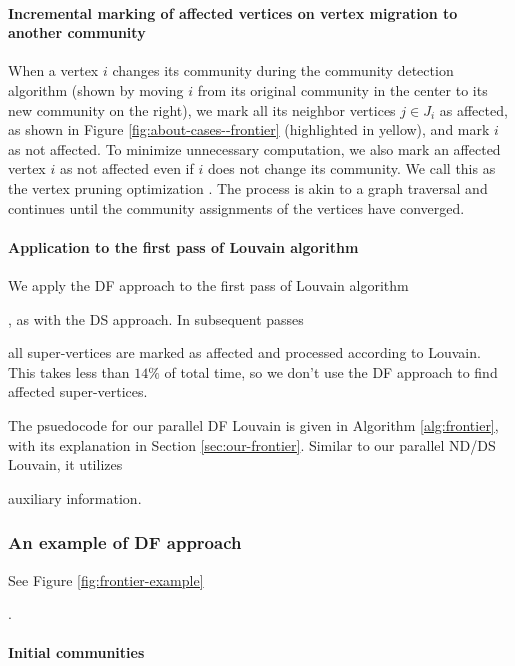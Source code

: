 \paragraph{Incremental marking of affected vertices on vertex migration to another community}

When a vertex $i$ changes its community during the community detection algorithm (shown by moving $i$ from its original community in the center to its new community on the right), we mark all its neighbor vertices $j \in J_i$ as affected, as shown in Figure \ref{fig:about-cases--frontier} (highlighted in yellow), and mark $i$ as not affected. To minimize unnecessary computation, we also mark an affected vertex $i$ as not affected even if $i$ does not change its community. We call this as the vertex pruning optimization \cite{com-ozaki16, com-ryu16, com-shi21, com-zhang21}. The process is akin to a graph traversal and continues until the community assignments of the vertices have converged.

\paragraph{Application to the first pass of Louvain algorithm}

We apply the DF approach to the first pass of Louvain algorithm, as with the DS approach. In subsequent passes all super-vertices are marked as affected and processed according to Louvain. This takes less than $14\%$ of total time, so we don't use the DF approach to find affected super-vertices. The psuedocode for our parallel DF Louvain is given in Algorithm \ref{alg:frontier}, with its explanation in Section \ref{sec:our-frontier}. Similar to our parallel ND/DS Louvain, it utilizes auxiliary information.


\subsubsection{An example of DF approach}

See Figure \ref{fig:frontier-example}.

\paragraph{Initial communities}

